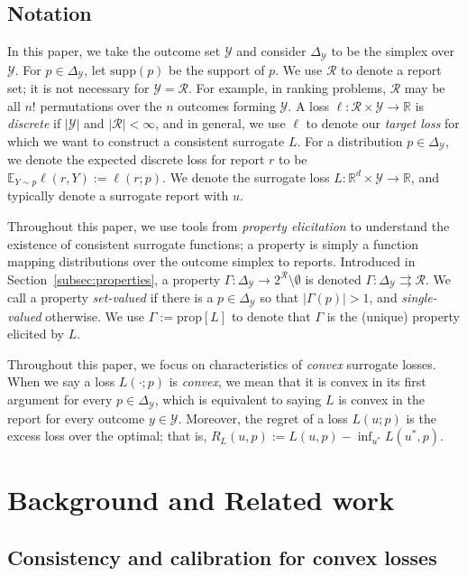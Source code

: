\documentclass{article}
\newcommand{\reals}{\mathbb{R}}
\newcommand{\simplex}{\Delta_\Y}
\newcommand{\prop}[1]{\mathrm{prop}[#1]}
\newcommand{\supp}{\mathrm{supp}}
\newcommand{\E}{\mathbb{E}}
\newcommand{\R}{\mathcal{R}}
\newcommand{\Y}{\mathcal{Y}}
\newcommand{\toto}{\rightrightarrows}
\begin{document}
\subsection{Notation}
In this paper, we take the outcome set $\Y$ and consider $\simplex$ to be the simplex over $\Y$.
For $p \in \simplex$, let $\supp(p)$ be the support of $p$.
We use $\R$ to denote a report set; it is not necessary for $\Y = \R$.  
For example, in ranking problems, $\R$ may be all $n!$ permutations over the $n$ outcomes forming $\Y$.
A loss $\ell : \R \times \Y \to \reals$ is \emph{discrete} if $|\Y|$ and $|\R| < \infty$, and in general, we use $\ell$ to denote our \emph{target loss} for which we want to construct a consistent surrogate $L$.
For a distribution $p \in \simplex$, we denote the expected discrete loss for report $r$ to be $\E_{Y \sim p} \ell(r, Y) := \ell(r; p)$.
We denote the surrogate loss $L : \reals^d \times \Y \to \reals$, and typically denote a surrogate report with $u$.

Throughout this paper, we use tools from \emph{property elicitation} to understand the existence of consistent surrogate functions; a property is simply a function mapping distributions over the outcome simplex to reports.
Introduced in Section~\ref{subsec:properties}, a property $\Gamma: \simplex \to 2^\R \setminus \emptyset$ is denoted $\Gamma:\simplex \toto \R$.
We call a property \emph{set-valued} if there is a $p \in \simplex$ so that $|\Gamma(p)| > 1$, and \emph{single-valued} otherwise.
We use $\Gamma := \prop{L}$ to denote that $\Gamma$ is the (unique) property elicited by $L$.

Throughout this paper, we focus on characteristics of \emph{convex} surrogate losses.
When we say a loss $L(\cdot; p)$ is \emph{convex}, we mean that it is convex in its first argument for every $p \in \simplex$, which is equivalent to saying $L$ is convex in the report for every outcome $y \in \Y$.
Moreover, the regret of a loss $L(u; p)$ is the excess loss over the optimal; that is, $R_L(u,p) := L(u,p) - \inf_{u^*} L(u^*, p)$.

\section{Background and Related work}\label{sec:related-work}

\subsection{Consistency and calibration for convex losses}\label{subsec:convex-surrogates}
\end{document}
